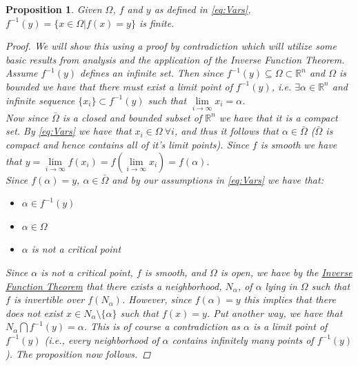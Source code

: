 \documentclass[11pt]{article}
\theoremstyle{plain}
\newtheorem{prop}[thm]{Proposition}
\theoremstyle{definition}
\theoremstyle{remark}
\begin{document}
\begin{prop} \label{finite}
Given $\Omega$, $f$ and $y$ as defined in \eqref{eq:Vars}, $f^{-1}(y)=\{x\in\Omega|f(x)=y\}$ is finite. 
\begin{proof}
We will show this using a proof by contradiction which will utilize some basic results from analysis and the application of the Inverse Function Theorem. \\

Assume $f^{-1}(y)$ defines an infinite set. Then since $f^{-1}(y)\subseteq\Omega\subset\mathbb{R}^n$ and $\Omega$ is bounded we have that there must exist a limit point of $f^{-1}(y)$, i.e. $\exists \alpha\in\mathbb{R}^n$ and infinite sequence $\{x_i\}\subset f^{-1}(y)$ such that $\lim\limits_{i\rightarrow\infty}x_i=\alpha$. \\

Now since $\bar{\Omega}$ is a closed and bounded subset of $\mathbb{R}^n$ we have that it is a compact set. By \eqref{eq:Vars} we have that $x_i\in\Omega \ \forall i$, and thus it follows that $\alpha\in\bar{\Omega}$ ($\bar{\Omega}$ is compact and hence contains all of it's limit points). Since $f$ is smooth we have that $y=\lim\limits_{i\rightarrow\infty}f(x_i)=f\left(\lim\limits_{i\rightarrow\infty}x_i\right)=f(\alpha)$.\\

Since $f(\alpha)=y$, $\alpha\in\bar{\Omega}$ and by our assumptions in \eqref{eq:Vars} we have that:
\begin{itemize}
\item $\alpha\in f^{-1}(y)$
\item $\alpha\in \Omega$
\item $\alpha$ is not a critical point
\end{itemize}

Since $\alpha$ is not a critical point, $f$ is smooth, and $\Omega$ is open, we have by the \href{https://en.wikipedia.org/wiki/Inverse_function_theorem}{Inverse Function Theorem} that there exists a neighborhood, $N_{\alpha}$, of $\alpha$ lying in $\Omega$ such that $f$ is invertible over $f(N_{\alpha})$.
However, since $f(\alpha)=y$ this implies that there does not exist $x\in N_{\alpha}\setminus\{\alpha\}$ such that $f(x)=y$.
Put another way, we have that $N_{\alpha}\bigcap f^{-1}(y)=\alpha$. This is of course a contradiction as $\alpha$ is a limit point of $f^{-1}(y)$ (i.e., every neighborhood of $\alpha$ contains infinitely many points of $f^{-1}(y)$).
The proposition now follows.
\end{proof}
\end{prop}
\end{document}
